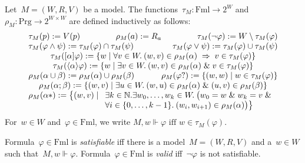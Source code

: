 \documentclass{entcs}
\newcommand{\Nat}{{\mathbb N}}
\newcommand{\ximp}{\;\Rightarrow\;}
\newcommand{\xand}{\;\&\;}
\newcommand{\xiff}{\text{ iff }}
\newcommand{\pnot}[1]{\lnot #1}
\newcommand{\pand}[2]{#1 \land #2}
\newcommand{\por}[2]{#1 \lor #2}
\newcommand{\pea}[2]{\langle#1\rangle #2}
\newcommand{\paa}[2]{[#1] #2}
\newcommand{\psp}[2]{#1;#2}
\newcommand{\pup}[2]{#1\cup#2}
\newcommand{\prp}[1]{#1*}
\newcommand{\pip}[1]{#1?}
\newcommand{\fml}{\mathrm{Fml}}
\newcommand{\prg}{\mathrm{Prg}}
\newcommand{\evf}[1]{\tau_{#1}}
\newcommand{\evp}[1]{\rho_{#1}}
\newcommand{\psr}[2]{#1 \Vdash #2}
\begin{document}
\begin{definition}
  Let~$M = (W,R,V)$ be a model.
  The functions~$\evf{M}: \fml \to 2^W$ and~$\evp{M}: \prg \to 2^{W \times W}$
  are defined inductively as follows:
  \begin{displaymath}
    \begin{array}{l@{\extracolsep{1cm}}r}
      \multicolumn{2}{c}{
        \evf{M}(p)
        :=
        V(p)
        \hfill
        \evp{M}(a)
        :=
        R_a
        \hfill
        \evf{M}(\pnot{\varphi})
        := 
        W \setminus \evf{M}(\varphi)}\\
      \evf{M}(\pand{\varphi}{\psi})
      := 
      \evf{M}(\varphi) \cap \evf{M}(\psi)
      &
      \evf{M}(\por{\varphi}{\psi})
      := \evf{M}(\varphi) \cup \evf{M}(\psi)\\
      \multicolumn{2}{c}{
        \evf{M}(\paa{\alpha}{\varphi})
        :=
        \{ w \mid \forall v \in W.\: (w, v) \in \evp{M}(\alpha) \ximp v \in \evf{M}(\varphi) \}}\\
      \multicolumn{2}{c}{
        \evf{M}(\pea{\alpha}{\varphi})
        := 
        \{ w \mid \exists v \in W.\: (w, v) \in \evp{M}(\alpha) \xand v \in \evf{M}(\varphi) \}}\\
      \evp{M}(\pup{\alpha}{\beta})
      := 
      \evp{M}(\alpha) \cup \evp{M}(\beta)
      &
      \evp{M}(\pip{\varphi})
      := \{ (w, w) \mid w \in \evf{M}(\varphi) \}\\
      \multicolumn{2}{c}{
        \evp{M}(\psp{\alpha}{\beta})
        := 
        \{ (w, v) \mid \exists u \in W.\: (w, u) \in \evp{M}(\alpha) \xand (u, v) \in \evp{M}(\beta) \}}\\
      \multicolumn{2}{c}{
        \evp{M}(\prp{\alpha})
        :=
        \big\{ (w, v) \mid
        \begin{array}[t]{l}
          \exists k \in \Nat.
          \exists w_0, \dotsc, w_k \in W.\: \big( w_0 = w \xand w_k = v \xand\\
          \forall i \in \{ 0, \dotsc, k-1 \}.\: (w_i, w_{i+1}) \in \evp{M}(\alpha) \big) \big\}
        \end{array}}\\
    \end{array}
  \end{displaymath}
  For~$w \in W$ and~$\varphi \in \fml$, we write
  $\psr{M,w}{\varphi} \xiff w \in \evf{M}(\varphi)$.
\end{definition}

\begin{definition}
  Formula~$\varphi \in \fml$ is \emph{satisfiable}
  iff there is a model~$M = (W,R,V)$ and a~$w \in W$
  such that~$\psr{M,w}{\varphi}$.
  Formula~$\varphi \in \fml$ is \emph{valid} iff~$\pnot{\varphi}$ is not satisfiable.
\end{definition}
\end{document}
